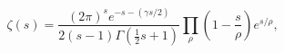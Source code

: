 \[\zeta\left(s\right)=\frac{(2\pi)^{s}e^{-s-(\gamma s/2)}}{2(s-1)\Gamma\left(%
\tfrac{1}{2}s+1\right)}\prod_{\rho}\left(1-\frac{s}{\rho}\right)e^{s/\rho},\]